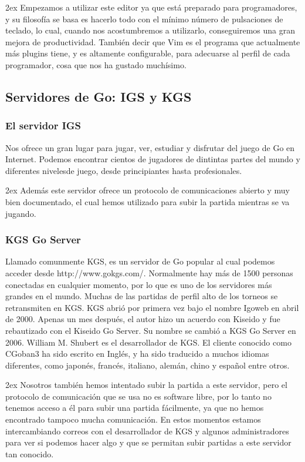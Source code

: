 \documentclass[12pt,a4papert,woside,openright,titlepage,final]{book}
\begin{document}
\parskip 2ex 
Empezamos a utilizar este editor ya que está preparado para
programadores, y su filosofía se basa es hacerlo todo con el mínimo número de
pulsaciones de teclado, lo cual, cuando nos acostumbremos a utilizarlo,
conseguiremos una gran mejora de productividad. También decir que Vim es el
programa que actualmente más plugins tiene, y es altamente configurable, para
adecuarse al perfil de cada programador, cosa que nos ha gustado muchísimo. 


\subsection{Servidores de Go: IGS y KGS}

\subsubsection{El servidor IGS}

Nos ofrece un gran lugar para jugar, ver, estudiar y disfrutar del juego de Go
en Internet. Podemos encontrar cientos de jugadores de dintintas partes del
mundo y diferentes nivelesde juego, desde principiantes hasta profesionales. 

\parskip 2ex
Además este servidor ofrece un protocolo de comunicaciones abierto y muy bien
documentado, el cual hemos utilizado para subir la partida mientras se va
jugando. 

\subsubsection{KGS Go Server}

Llamado comunmente KGS, es un servidor de Go popular al cual podemos acceder
desde http://www.gokgs.com/. Normalmente hay más de 1500 personas conectadas en
cualquier momento, por lo que es uno de los servidores más grandes en el mundo.
Muchas de las partidas de perfil alto de los torneos se retransmiten en KGS. KGS
abrió por primera vez bajo el nombre Igoweb en abril de 2000.  Apenas un mes
después, el autor hizo un acuerdo con Kiseido y fue rebautizado con el Kiseido
Go Server. Su nombre se cambió a KGS Go Server en 2006. William M. Shubert es el
desarrollador de KGS. El cliente conocido como CGoban3 ha sido escrito en
Inglés, y ha sido traducido a muchos idiomas diferentes, como japonés, francés,
italiano, alemán, chino y español entre otros. 

\parskip 2ex
Nosotros también hemos intentado subir la partida a este servidor, pero el
protocolo de comunicación que se usa no es software libre, por lo tanto no
tenemos acceso a él para subir una partida fácilmente, ya que no hemos
encontrado tampoco mucha comunicación. En estos momentos estamos intercambiando
correos con el desarrollador de KGS y algunos administradores para ver si
podemos hacer algo y que se permitan subir partidas a este servidor tan
conocido. 
\end{document}
